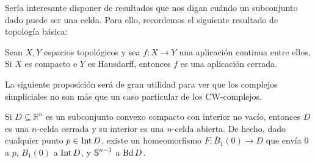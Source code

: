 Sería interesante disponer de resultados que nos digan cuándo un subconjunto dado
puede ser una celda. Para ello, recordemos el siguiente resultado de topología básica:

\begin{lema}
	\label{lem:closed-map} Sean $X,Y$ espacios topológicos y sea $f : X \to Y$ una
	aplicación continua entre ellos. Si $X$ es compacto e $Y$ es Hausdorff, entonces
	$f$ es una aplicación cerrada.
\end{lema}

La siguiente proposición será de gran utilidad para ver que los complejos
simpliciales no son más que un caso particular de los CW-complejos.

\begin{proposicion}
	\label{prop:compact-convex-closed-cell} Si $D \subseteq \mathbb{R}^{n}$ es un subconjunto
	convexo compacto con interior no vacío, entonces $D$ es una $n$-celda cerrada
	y su interior es una $n$-celda abierta. De hecho, dado cualquier punto
	$p \in \operatorname{Int} D$, existe un homeomorfismo $F : \overline{B}_{1}(0) \to D$ que
	envía $0$ a $p$, $B_{1}(0)$ a $\operatorname{Int} D$, y $\operatorname{\mathbb{S}}^{n-1}$ a $\operatorname{Bd} D$.
\end{proposicion}

